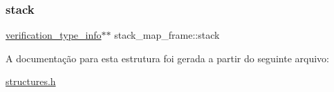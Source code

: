 \subsubsection{\texorpdfstring{stack}{stack}}
{\footnotesize\ttfamily \hyperlink{structverification__type__info}{verification\+\_\+type\+\_\+info}$\ast$$\ast$ stack\+\_\+map\+\_\+frame\+::stack}



A documentação para esta estrutura foi gerada a partir do seguinte arquivo\+:\begin{DoxyCompactItemize}
\item 
\hyperlink{structures_8h}{structures.\+h}\end{DoxyCompactItemize}
